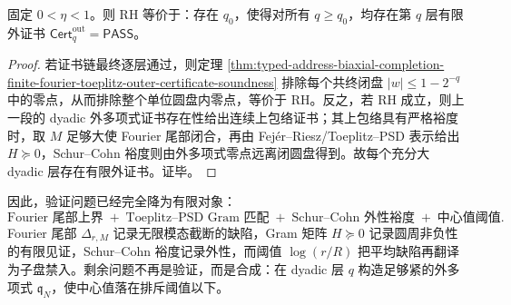 \begin{corollary}[RH 的有限外证书链表述]\label{cor:typed-address-biaxial-completion-rh-finite-outer-certificate-chain}
固定 \(0<\eta<1\)。则 RH 等价于：存在 \(q_0\)，使得对所有 \(q\ge q_0\)，均存在第 \(q\) 层有限外证书 \(\mathsf{Cert}^{\mathrm{out}}_q=\mathsf{PASS}\)。
\end{corollary}
\begin{proof}
若证书链最终逐层通过，则定理 \ref{thm:typed-address-biaxial-completion-finite-fourier-toeplitz-outer-certificate-soundness} 排除每个共终闭盘 \(|w|\le1-2^{-q}\) 中的零点，从而排除整个单位圆盘内零点，等价于 RH。反之，若 RH 成立，则上一段的 dyadic 外多项式证书存在性给出连续上包络证书；其上包络具有严格裕度时，取 \(M\) 足够大使 Fourier 尾部闭合，再由 Fej\'er--Riesz/Toeplitz--PSD 表示给出 \(H\succeq0\)，Schur--Cohn 裕度则由外多项式零点远离闭圆盘得到。故每个充分大 dyadic 层存在有限外证书。证毕。
\end{proof}

因此，验证问题已经完全降为有限对象：
\[
\text{Fourier 尾部上界}
\;+\;
\text{Toeplitz--PSD Gram 匹配}
\;+\;
\text{Schur--Cohn 外性裕度}
\;+\;
\text{中心值阈值}.
\]
Fourier 尾部 \(\Delta_{r,M}\) 记录无限模态截断的缺陷，Gram 矩阵 \(H\succeq0\) 记录圆周非负性的有限见证，Schur--Cohn 裕度记录外性，而阈值 \(\log(r/R)\) 把平均缺陷再翻译为子盘禁入。剩余问题不再是验证，而是合成：在 dyadic 层 \(q\) 构造足够紧的外多项式 \(\mathfrak q_N\)，使中心值落在排斥阈值以下。
